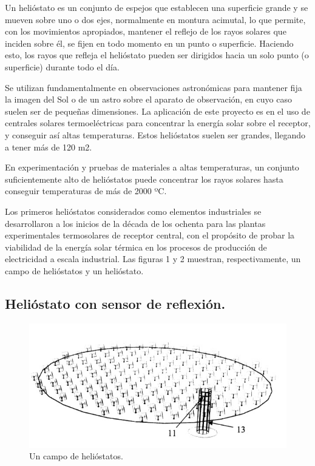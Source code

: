 Un helióstato es un conjunto de espejos que establecen una superficie grande y se mueven sobre uno o dos ejes, normalmente en montura acimutal, lo que permite, con los movimientos apropiados, mantener el reflejo de los rayos solares que inciden sobre él, se fijen en todo momento en un punto o superficie. Haciendo esto, los rayos que refleja el helióstato pueden ser dirigidos hacia un solo punto (o superficie) durante todo el día.

Se utilizan fundamentalmente en observaciones astronómicas para mantener fija la imagen del Sol o de un astro sobre el aparato de observación, en cuyo caso suelen ser de pequeñas dimensiones. La aplicación de este proyecto es en el uso de centrales solares termoeléctricas para concentrar la energía solar sobre el receptor, y conseguir así altas temperaturas. Estos helióstatos suelen ser grandes, llegando a tener más de 120 m2.

En experimentación y pruebas de materiales a altas temperaturas, un conjunto suficientemente alto de helióstatos puede concentrar los rayos solares hasta conseguir temperaturas de más de 2000 ºC.

Los primeros helióstatos considerados como elementos industriales se desarrollaron a los inicios de la década de los ochenta para las plantas experimentales termosolares de receptor central, con el propósito de probar la viabilidad de la energía solar térmica en los procesos de producción de electricidad a escala industrial. Las figuras 1 y 2 muestran, respectivamente, un campo de helióstatos y un helióstato.

\subsection{Helióstato con sensor de reflexión.}

\begin{figure}[h!]
  	\centering
	\includegraphics[scale=0.7]{FotosPaginasWebHeliostatos/unnamed(1).jpg}
	\caption{Un campo de helióstatos.~\cite{OepmWebSite} \label{fig:FotosPaginasWebHeliostatos/unnamed(1).jpg}}
\end{figure}

